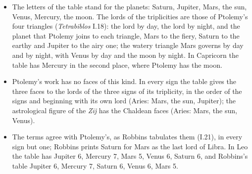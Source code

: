 \documentclass[11pt]{article}
\begin{document}
\begin{itemize}\footnotesize\item The letters of the table stand for the planets:  Saturn,  Jupiter,  Mars,  the sun,  Venus,  Mercury,  the moon. The lords of the triplicities are those of Ptolemy's four triangles (\emph{Tetrabiblos} I.18): the lord by day, the lord by night, and the planet that Ptolemy joins to each triangle, Mars to the fiery, Saturn to the earthy and Jupiter to the airy one; the watery triangle Mars governs by day and by night, with Venus by day and the moon by night. In Capricorn the table has Mercury in the second place, where Ptolemy has the moon.\item Ptolemy's work has no faces of this kind. In every sign the table gives the three faces to the lords of the three signs of its triplicity, in the order of the signs and beginning with its own lord (Aries: Mars, the sun, Jupiter); the astrological figure of the \emph{Zīj} has the Chaldean faces (Aries: Mars, the sun, Venus).\item The terms agree with Ptolemy's, as Robbins tabulates them (I.21), in every sign but one; Robbins prints Saturn for Mars as the last lord of Libra. In Leo the table has Jupiter 6, Mercury 7, Mars 5, Venus 6, Saturn 6, and Robbins's table Jupiter 6, Mercury 7, Saturn 6, Venus 6, Mars 5.\end{itemize}
\clearpage{}\medskip
{}\medskip
\end{document}
